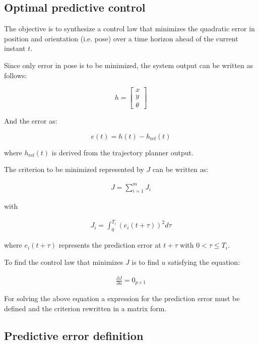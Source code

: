 \documentclass[letterpaper, 10 pt, conference]{ieeeconf}  %
\begin{document}
\subsection{Optimal predictive control}

The objective is to synthesize a control law that minimizes the quadratic error in position and orientation (i.e. pose) over a time horizon ahead of the current instant $t$.

Since only error in pose is to be minimized, the system output can be written as follows:

\[
h = \left[\begin{array}{c}
x\\
y\\
\theta
\end{array}
\right]
\]

And the error as:

\[
	e(t) =  h(t) - h_{\text{ref}}(t)
\]

where ${h_{\text{ref}}(t)}$ is derived from the trajectory planner output.

The criterion to be minimized represented by $J$ can be written as:

\begin{align*}
J = \sum_{i=1}^m J_i 
\end{align*}

with

\begin{align*}
J_i = \int_0^{T_i} (e_i(t+\tau))^2d\tau
\end{align*}

where ${e_i(t+\tau)}$ represents the prediction error at ${t+\tau}$ with ${0 < \tau \leq T_i}$.

To find the control law that minimizes $J$ is to find $u$ satisfying the equation:

\begin{align*}
\frac{\partial J}{\partial u} = 0_{p\times 1}
\end{align*}

For solving the above equation a expression for the prediction error must be defined and the criterion rewritten in a matrix form.


\subsection{Predictive error definition}
\end{document}
